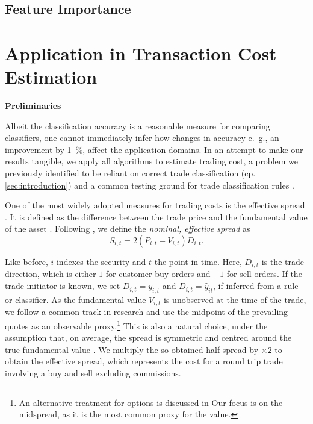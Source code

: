\subsection{Feature Importance}\label{sec:feature-importance}

\newpage
\section{Application in Transaction Cost Estimation}\label{sec:application}

\textbf{Preliminaries}


Albeit the classification accuracy is a reasonable measure for comparing classifiers, one cannot immediately infer how changes in accuracy e.~g., an improvement by \SI{1}{\percent}, affect the application domains. In an attempt to make our results tangible, we apply all algorithms to estimate trading cost, a problem we previously identified to be reliant on correct trade classification (cp. \cref{sec:introduction}) and a common testing ground for trade classification rules \autocites[cp.][541]{ellisAccuracyTradeClassification2000}[][569]{finucaneDirectTestMethods2000}[][271--278]{petersonEvaluationBiasesExecution2003}[][896--897]{savickasInferringDirectionOption2003}.

One of the most widely adopted measures for trading costs is the effective spread \autocite[][112]{Piwowar_2006}. It is defined as the difference between the trade price and the fundamental value of the asset \autocite[][238--239]{bessembinderIssuesAssessingTrade2003}. Following \textcite[][238--239]{bessembinderIssuesAssessingTrade2003}, we define the \emph{nominal, effective spread} as
\begin{equation}
    S_{i,t} = 2 (P_{i,t} - V_{i,t}) D_{i,t}.
    \label{eq:effective-spread}
\end{equation}

Like before, $i$ indexes the security and $t$ the point in time. Here, $D_{i,t}$ is the trade direction, which is either $1$ for customer buy orders and $-1$ for sell orders. If the trade initiator is known, we set $D_{i,t} = y_{i,t}$ and $D_{i,t}=\hat{y}_{it}$, if inferred from a rule or classifier. As the fundamental value $V_{i,t}$ is unobserved at the time of the trade, we follow a common track in research and use the midpoint of the prevailing quotes as an observable proxy.\footnote{An alternative treatment for options is discussed in \textcite[][4975--4976]{muravyevOptionsTradingCosts2020} Our focus is on the midspread, as it is the most common proxy for the value.} This is also a natural choice, under the assumption that, on average, the spread is symmetric and centred around the true fundamental value \autocite[][1018]{leeMarketIntegrationPrice1993}. We multiply the so-obtained half-spread by $\times 2$ to obtain the effective spread, which represents the cost for a round trip trade involving a buy and sell excluding commissions.

